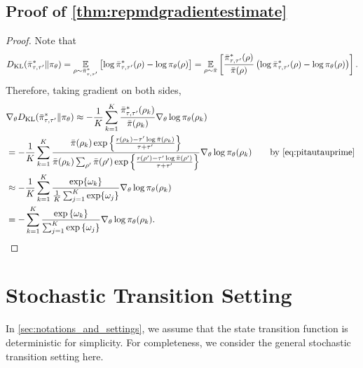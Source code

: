 \subsection{Proof of \cref{thm:repmdgradientestimate}}
\begin{proof}
	Note that
	\begin{equation*}
	\label{eq:importance_sampling_kl}
	D_{\mathrm{KL}}(\bar{\pi}_{\tau,\tau^{\prime}}^* \| \pi_\theta) = \operatorname*{\mathbb{E}}_{\rho \sim \bar{\pi}_{\tau,\tau^{\prime}}^* } \left[ \log \bar{\pi}_{\tau,\tau^{\prime}}^*(\rho) - \log \pi_\theta(\rho) \right] = \operatorname*{\mathbb{E}}_{\rho\sim \bar{\pi}} \left[  \frac{\bar{\pi}_{\tau,\tau^{\prime}}^*(\rho)}{\bar{\pi}(\rho)} \left(\log \bar{\pi}_{\tau,\tau^{\prime}}^*(\rho) - \log \pi_\theta(\rho) \right) \right].
	\end{equation*}	
	Therefore, taking gradient on both sides,
	\begin{equation}
	\begin{split}
	&\nabla_{\theta} \KL(\bar{\pi}_{\tau,\tau^{\prime}}^* \| \pi_\theta) \approx -\frac{1}{K}\sum_{k=1}^K \frac{\bar{\pi}_{\tau,\tau^{\prime}}^* (\rho_k)}{\refPi(\rho_k)} \nabla_{\theta} \log \pi_\theta(\rho_k)\\ 
	&= -\frac{1}{K}\sum_{k=1}^K \frac{ \refPi(\rho_k) \exp\left\{ \frac{r(\rho_k)-\tau^{\prime} \log \refPi(\rho_k) }{ \tau+\tau^{\prime}} \right\} }{\refPi(\rho_k)  \sum_{\rho^{\prime}}{\refPi(\rho^{\prime}) \exp\left\{ \frac{r(\rho^{\prime})-\tau^{\prime} \log \refPi(\rho^{\prime})}{ \tau+\tau^{\prime}} \right\} }  } \nabla_{\theta} \log \pi_\theta(\rho_k) \qquad \text{by \cref{eq:pitautauprime} }  \\
	&\approx -\frac{1}{K}\sum_{k=1}^K \frac{\exp \{\omega_k\}} {\frac{1}{K} \sum_{j=1}^K \exp \{\omega_j\}} \nabla_{\theta} \log \pi_\theta(\rho_k) \\
	&=  -\sum\limits_{k=1}^K{ \frac{ \exp\left\{ \omega_k \right\} }{ \sum_{j=1}^K{ \exp\left\{ \omega_j \right\}}} \nabla_{\theta} \log{\pi_\theta(\rho_k)} } \qedhere.
	\end{split}
	\end{equation}
\end{proof}

\section{Stochastic Transition Setting}
\label{sec:stochasticsetting}
In \cref{sec:notations_and_settings}, we assume that the state transition function is deterministic for simplicity. For completeness, we consider the general stochastic transition setting here.

